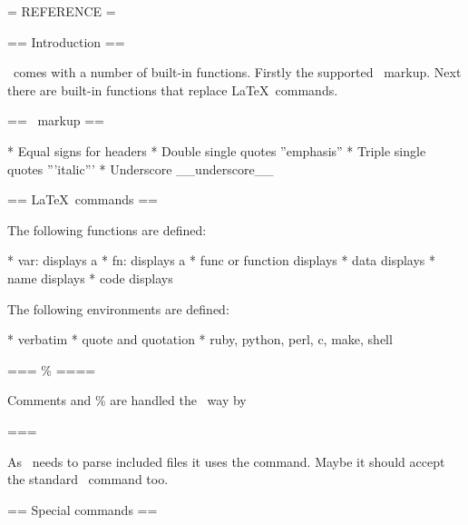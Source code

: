 
= REFERENCE =

== Introduction ==

\wikitexer\ comes with a number of built-in functions. Firstly the
supported \mediawiki\ markup. Next there are built-in functions that
replace \LaTeX\ commands. 

== \mediawiki\ markup ==

* Equal signs for headers
* Double single quotes ''emphasis''
* Triple single quotes '''italic'''
* Underscore __underscore__

== \LaTeX\ commands ==

The following functions are defined:

* var: displays a 
* fn:  displays a 
* func or function displays 
* data displays 
* name displays 
* code displays 

The following environments are defined:

* verbatim
* quote and quotation
* ruby, python, perl, c, make, shell

=== \% ====

Comments and \% are handled the \latex\ way by \wikitexer\

=== 

As \wiktexer\ needs to parse included files it uses the
 command. Maybe it should accept the standard
\ command too.

== Special commands ==
